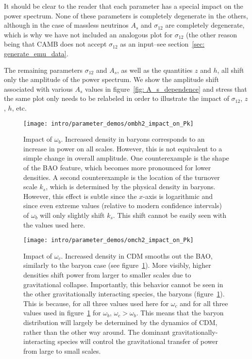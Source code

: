 It should be
clear to the reader that each parameter has a special impact on the power
spectrum. None of these parameters is completely degenerate in the others,
although in the case of massless neutrinos $A_s$ and $\sigma_{12}$ are
completely degenerate, which is why we have not included an analogous plot for
$\sigma_{12}$ (the other reason being that CAMB does not accept $\sigma_{12}$
as an input--see section~\ref{sec: generate_emu_data}.

The remaining parameters $\sigma_{12}$ and $A_s$, as well as the quantities 
$z$ and $h$, all shift only the amplitude of the power spectrum. We show the 
amplitude shift associated with various $A_s$ values in figure~\ref{fig: 
A_s_dependence} and stress that the same plot only needs to be relabeled in 
order to illustrate the impact of $\sigma_{12}$, $z$, $h$, etc. 

\begin{figure}[ht!]
  \centering
  \texttt{[image: intro/parameter\_demos/ombh2\_impact\_on\_Pk]}
  \caption[Impact of $\omega_b$ on $P(k)$]{Impact of $\omega_b$. Increased
  	density in baryons corresponds to an increase in power on all scales.
  	However, this is not equivalent to a simple change in overall amplitude.
  	One counterexample is the shape of the BAO feature, which becomes more
  	pronounced for lower densities. A second counterexample is the location
  	of the turnover scale $k_s$, which is determined by the physical density
  	in baryons. However, this effect is subtle since the $x$-axis is
  	logarithmic and since even extreme values (relative to modern confidence
  	intervals) of $\omega_b$ will only slightly shift $k_s$. This shift
  	cannot be easily seen with the values used here.} 
  \label{fig: omega_b_dependence}
\end{figure}

\begin{figure}[ht!]
  \centering
  \texttt{[image: intro/parameter\_demos/omch2\_impact\_on\_Pk]}
  \caption[Impact of $\omega_c$ on $P(k)$]{Impact of $\omega_c$. Increased
  	density in CDM smooths out the BAO, similarly to the baryon case
  	(see figure~\ref{fig: omega_b_dependence}). More visibly, higher
  	densities shift power from larger to smaller scales due to gravitational 
  	collapse. Importantly, this behavior cannot be seen in the other
  	gravitationally interacting species, the baryons
  	(figure~\ref{fig: omega_b_dependence}). This is because, for all three
  	values used here for $\omega_c$ and for all three values used in
  	figure~\ref{fig: omega_b_dependence} for $\omega_b$,
  	$\omega_c > \omega_b$. This means that the baryon distribution will
  	largely be determined by the dynamics of CDM, rather than the
  	other way around. The dominant gravitationally-interacting species will
  	control the gravitational transfer of power from large to small scales.}
  \label{fig: omega_c_dependence}
\end{figure}

